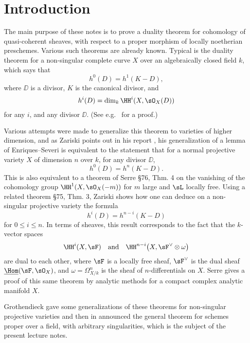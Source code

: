 \chapter{Introduction}
\bigskip
The main purpose of these notes is to prove a duality theorem for cohomology of quasi-coherent sheaves, with respect to a proper morphism of locally noetherian preschemes. Various such theorems are already known. Typical is the duality theorem for a non-singular complete curve $X$ over an algebraically closed field $k$, which says that
\[
h^{0}(D)=h^{1}(K-D),
\]
where $\DD$ is a divisor, $K$ is the canonical divisor, and
\[
h^{i}(D)=\dim_{k} \HH^{i}(X, \sO_{X}(D))
\]
for any $i$, and any divisor $\DD$. (See e.g.~\cite{16, Ch. II} for a proof.)

Various attempts were made to generalize this theorem to varieties of higher dimension, and as Zariski points out in his report \cite{20}, his generalization of a lemma of Enriques--Severi \cite{19} is equivalent to the statement that for a normal projective variety $X$ of dimension $n$ over $k$, for any divisor $\DD$,
\[
h^{0}(D)=h^{n}(K-D).
\]
This is also equivalent to a theorem of Serre \cite{FAC} \S 76, Thm. 4
on the vanishing of the cohomology group $\HH^{1}(X, \sO_{X}(-m))$ for $m$ large and $\sL$ locally free. Using a related theorem \cite{FAC} \S 75, Thm. 3, Zariski shows how one can deduce on a non-singular projective variety the formula
\[
h^{i}(D)=h^{n-i}(K-D)
\]
for $0\leq i\leq n$. In terms of sheaves, this result corresponds to the fact that the $k$-vector spaces
\[
\HH^{i}(X, \sF) \quad\text{and}\quad \HH^{n-i}\bigl(X, \sF^{\vee}\otimes\omega\bigr)
\]
are dual to each other, where $\sF$ is a locally free sheaf, $\sF^{\vee}$ is the dual sheaf $\underline{\Hom}(\sF,\sO_{X})$,
 and $\omega=\Omega_{X/k}^{n}$ is the sheaf of $n$-differentials on $X$. Serre \cite{15} gives a proof of this same theorem by analytic methods for a compact complex analytic manifold $X$.

Grothendieck \cite{8} gave some generalizations of these theorems for non-singular projective varieties and then in \cite{9} announced the general theorem for schemes proper over a field, with arbitrary singularities, which is the subject of the present lecture notes.

